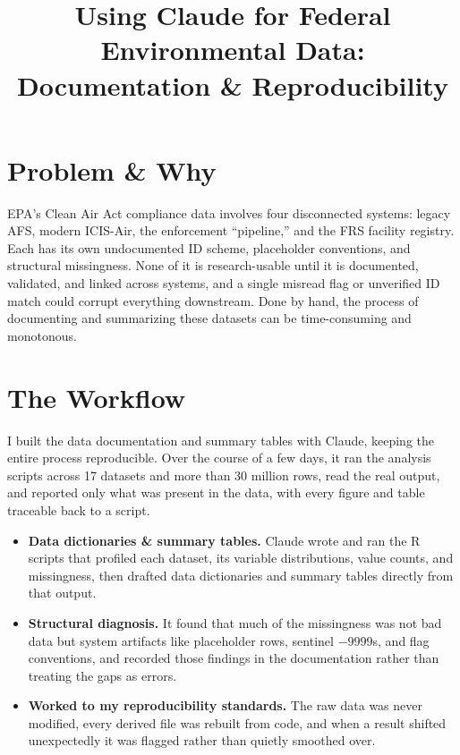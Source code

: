 \documentclass[11pt]{article}
\title{\vspace{-2em}\textbf{Using Claude for Federal Environmental Data: Documentation \& Reproducibility}}
\author{}
\date{}
\begin{document}
\maketitle
\vspace{-3em}

\section*{Problem \& Why}

EPA's Clean Air Act compliance data involves four disconnected systems: legacy
AFS, modern ICIS-Air, the enforcement ``pipeline,'' and the FRS facility
registry. Each has its own undocumented ID scheme, placeholder conventions, and
structural missingness. None of it is research-usable until it is documented,
validated, and linked across systems, and a single misread flag or unverified
ID match could corrupt everything downstream. Done by hand, the process of documenting and summarizing these datasets can be time-consuming and
monotonous.

\section*{The Workflow}

I built the data documentation and summary tables with Claude, keeping the
entire process reproducible. Over the course of a few days, it ran the analysis scripts across 17 datasets and
more than 30 million rows, read the real output, and reported only what was
present in the data, with every figure and table traceable back to a script.

\begin{itemize}
  \item \textbf{Data dictionaries \& summary tables.} Claude wrote and ran the R scripts
        that profiled each dataset, its variable distributions, value counts,
        and missingness, then drafted data dictionaries and summary tables directly from
        that output.
  \item \textbf{Structural diagnosis.} It found that much of the missingness was
        not bad data but system artifacts like placeholder rows, sentinel
        $-9999$s, and flag conventions, and recorded those findings in the
        documentation rather than treating the gaps as errors.
  \item \textbf{Worked to my reproducibility standards.} The raw data was never
        modified, every derived file was rebuilt from code, and when a result
        shifted unexpectedly it was flagged rather than quietly smoothed over.
\end{itemize}
\end{document}
